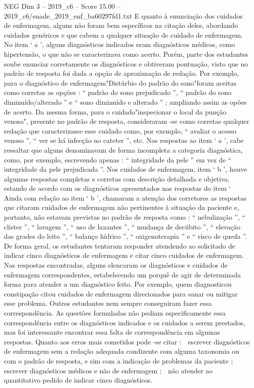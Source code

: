\begin{textsample}{NEG Dim 3 – 2019\_c6 – Score 15.00 – 2019\_c6/enade\_2019\_enf\_ba60297fd1.txt}
E quanto à enunciação dos cuidados de enfermagem, alguns não foram bem específicos na citação deles, abordando cuidados genéricos e que cabem a qualquer situação de cuidado de enfermagem.
No item ‘ a ’, alguns diagnósticos indicados eram diagnósticos médicos, como hipertensão, o que não se caracterizava como acerto.
Porém, parte dos estudantes soube enunciar corretamente os diagnósticos e obtiveram pontuação, visto que no padrão de resposta foi dada a opção de aproximação de redação.
Por exemplo, para o diagnóstico de enfermagem"Distúrbio do padrão do sono"foram aceitas como corretas as opções : “ padrão do sono prejudicado ”, “ padrão do sono diminuído/alterado ” e “ sono diminuído e alterado ” ; ampliando assim as opões de acerto.
Da mesma forma, para o cuidado"inspecionar o local da punção venosa", presente no padrão de resposta, consideraram -se como corretas qualquer redação que caracterizasse esse cuidado como, por exemplo, “ avaliar o acesso venoso ”, “ ver se há infecção no cateter ”, etc.
Nas respostas ao item ‘ a ’, cabe ressaltar que alguns denominavam de forma incompleta a categoria diagnóstica, como, por exemplo, escrevendo apenas : “ integridade da pele ” em vez de “ integridade da pele prejudicada ”.
Nos cuidados de enfermagem, item ‘ b ’, houve algumas respostas completas e corretas com descrição detalhada e objetiva, estando de acordo com os diagnósticos apresentados nas respostas do item ‘ Ainda com relação ao item ‘ b ’, chamaram a atenção dos corretores as respostas que citaram cuidados de enfermagem não pertinentes à situação da paciente e, portanto, não estavam previstas no padrão de resposta como : “ nebulização ”, “ clister ”, “ lavagem ”, “ uso de laxantes ”, “ mudança de decúbito ”, “ elevação das grades do leito ”, “ balanço hídrico ”, “ oxigenoterapia ” e “ risco de queda ”.
De forma geral, os estudantes tentaram responder atendendo ao solicitado de indicar cinco diagnósticos de enfermagem e citar cinco cuidados de enfermagem.
Nas respostas encontradas, alguns elencaram os diagnósticos e cuidados de enfermagem correspondentes, estabelecendo um porquê de agir de determinada forma para atender a um diagnóstico feito.
Por exemplo, quem diagnosticou constipação citou cuidados de enfermagem direcionados para sanar ou mitigar esse problema.
Outros estudantes nem sempre conseguiram fazer essa correspondência.
As questões formuladas não pediam especificamente essa correspondência entre os diagnósticos indicados e os cuidados a serem prestados, mas foi interessante encontrar essa falta de correspondência em algumas respostas.
Quanto aos erros mais cometidos pode -se citar :  escrever diagnósticos de enfermagem sem a redação adequada condizente com alguma taxonomia ou com o padrão de resposta, e sim com a indicação de problemas da paciente ;  escrever diagnósticos médicos e não de enfermagem ;  não atender ao quantitativo pedido de indicar cinco diagnósticos.

\end{textsample}
